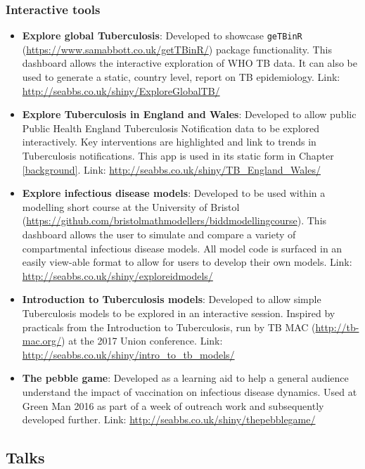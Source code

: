 \documentclass[11pt,twoside]{bristolthesis}
\begin{document}
  \hypertarget{interactive-tools}{%
  \subsubsection{Interactive tools}\label{interactive-tools}}
  \begin{itemize}
  \item
    \textbf{Explore global Tuberculosis}: Developed to showcase \texttt{geTBinR} (\url{https://www.samabbott.co.uk/getTBinR/}) package functionality. This dashboard allows the interactive exploration of WHO TB data. It can also be used to generate a static, country level, report on TB epidemiology. Link: \url{http://seabbs.co.uk/shiny/ExploreGlobalTB/}
  \item
    \textbf{Explore Tuberculosis in England and Wales}: Developed to allow public Public Health England Tuberculosis Notification data to be explored interactively. Key interventions are highlighted and link to trends in Tuberculosis notifications. This app is used in its static form in Chapter \ref{background}. Link: \url{http://seabbs.co.uk/shiny/TB_England_Wales/}
  \item
    \textbf{Explore infectious disease models}: Developed to be used within a modelling short course at the University of Bristol (\url{https://github.com/bristolmathmodellers/biddmodellingcourse}). This dashboard allows the user to simulate and compare a variety of compartmental infectious disease models. All model code is surfaced in an easily view-able format to allow for users to develop their own models. Link: \url{http://seabbs.co.uk/shiny/exploreidmodels/}
  \item
    \textbf{Introduction to Tuberculosis models}: Developed to allow simple Tuberculosis models to be explored in an interactive session. Inspired by practicals from the Introduction to Tuberculosis, run by TB MAC (\url{http://tb-mac.org/}) at the 2017 Union conference. Link: \url{http://seabbs.co.uk/shiny/intro_to_tb_models/}
  \item
    \textbf{The pebble game}: Developed as a learning aid to help a general audience understand the impact of vaccination on infectious disease dynamics. Used at Green Man 2016 as part of a week of outreach work and subsequently developed further. Link: \url{http://seabbs.co.uk/shiny/thepebblegame/}
  \end{itemize}
  \hypertarget{talks}{%
  \subsection{Talks}\label{talks}}
\end{document}
